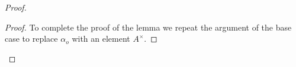 \begin{proof}
\begin{proof}
    To complete the proof of the lemma we repeat the argument of the base case to replace $\alpha_o$ with an element $A^\times$.
  \end{proof}




\end{proof}
